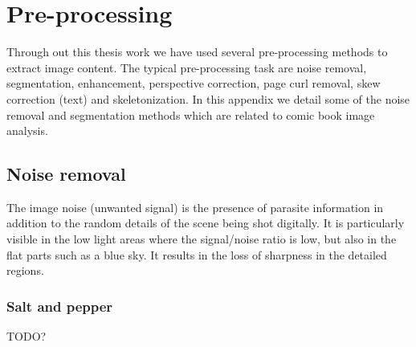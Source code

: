\chapter{Pre-processing}
\label{app:pre-processing}
\graphicspath{{./chapters/Appendix/figs/}}


Through out this thesis work we have used several pre-processing methods to extract image content.
The typical pre-processing task are noise removal, segmentation, enhancement, perspective correction, page curl removal, skew correction (text) and skeletonization.
In this appendix we detail some of the noise removal and segmentation methods which are related to comic book image analysis.




\section{Noise removal} %
\label{sub:ap:noise_removal}
The image noise (unwanted signal) is the presence of parasite information in addition to the random details of the scene being shot digitally.
It is particularly visible in the low light areas where the signal/noise ratio is low, but also in the flat parts such as a blue sky.
It results in the loss of sharpness in the detailed regions.

\subsection{Salt and pepper} %
\label{sub:salt_and_paper}
TODO?

